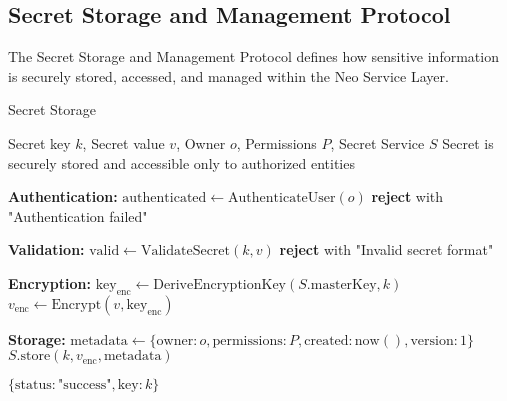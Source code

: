 \subsection{Secret Storage and Management Protocol}
\label{subsec:secret-protocol}

The Secret Storage and Management Protocol defines how sensitive information is securely stored, accessed, and managed within the Neo Service Layer.

\begin{tcolorbox}[
    enhanced,
    colback=blue!5!white,
    colframe=blue!75!black,
    arc=5mm,
    boxrule=1.5pt,
    title=Secret Storage Protocol,
    fonttitle=\bfseries,
    coltitle=white,
    attach boxed title to top left={yshift=-2mm, xshift=5mm},
    boxed title style={colback=blue!75!black, rounded corners},
    shadow={2mm}{-2mm}{0mm}{black!50},
    drop fuzzy shadow
]
\begin{protocol}{Secret Storage}
\label{prot:secret-storage}
\begin{algorithmic}[1]
\Require Secret key $k$, Secret value $v$, Owner $o$, Permissions $P$, Secret Service $S$
\Ensure Secret is securely stored and accessible only to authorized entities

\State \textbf{Authentication:}
\State $\text{authenticated} \gets \text{AuthenticateUser}(o)$
    \State \textbf{reject} with "Authentication failed"
\EndIf

\State \textbf{Validation:}
\State $\text{valid} \gets \text{ValidateSecret}(k, v)$
    \State \textbf{reject} with "Invalid secret format"
\EndIf

\State \textbf{Encryption:}
\State $\text{key}_{\text{enc}} \gets \text{DeriveEncryptionKey}(S.\text{masterKey}, k)$
\State $v_{\text{enc}} \gets \text{Encrypt}(v, \text{key}_{\text{enc}})$

\State \textbf{Storage:}
\State $\text{metadata} \gets \{\text{owner}: o, \text{permissions}: P, \text{created}: \text{now}(), \text{version}: 1\}$
\State $S.\text{store}(k, v_{\text{enc}}, \text{metadata})$

\State \Return $\{\text{status}: \text{"success"}, \text{key}: k\}$
\end{algorithmic}
\end{protocol}
\end{tcolorbox}

